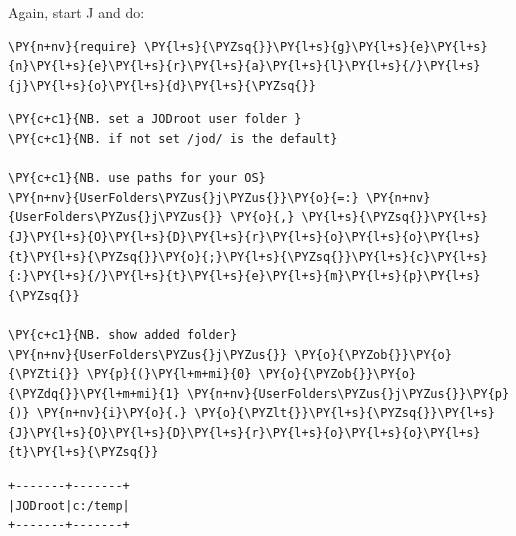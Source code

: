 Again, start J and do:

    \begin{tcolorbox}[breakable, size=fbox, boxrule=1pt, pad at break*=1mm,colback=cellbackground, colframe=cellborder]
\begin{Verbatim}[commandchars=\\\{\}]
\PY{n+nv}{require} \PY{l+s}{\PYZsq{}}\PY{l+s}{g}\PY{l+s}{e}\PY{l+s}{n}\PY{l+s}{e}\PY{l+s}{r}\PY{l+s}{a}\PY{l+s}{l}\PY{l+s}{/}\PY{l+s}{j}\PY{l+s}{o}\PY{l+s}{d}\PY{l+s}{\PYZsq{}}
\end{Verbatim}
\end{tcolorbox}

    \begin{tcolorbox}[breakable, size=fbox, boxrule=1pt, pad at break*=1mm,colback=cellbackground, colframe=cellborder]
\begin{Verbatim}[commandchars=\\\{\}]
\PY{c+c1}{NB. set a JODroot user folder }
\PY{c+c1}{NB. if not set /jod/ is the default}

\PY{c+c1}{NB. use paths for your OS}
\PY{n+nv}{UserFolders\PYZus{}j\PYZus{}}\PY{o}{=:} \PY{n+nv}{UserFolders\PYZus{}j\PYZus{}} \PY{o}{,} \PY{l+s}{\PYZsq{}}\PY{l+s}{J}\PY{l+s}{O}\PY{l+s}{D}\PY{l+s}{r}\PY{l+s}{o}\PY{l+s}{o}\PY{l+s}{t}\PY{l+s}{\PYZsq{}}\PY{o}{;}\PY{l+s}{\PYZsq{}}\PY{l+s}{c}\PY{l+s}{:}\PY{l+s}{/}\PY{l+s}{t}\PY{l+s}{e}\PY{l+s}{m}\PY{l+s}{p}\PY{l+s}{\PYZsq{}}

\PY{c+c1}{NB. show added folder}
\PY{n+nv}{UserFolders\PYZus{}j\PYZus{}} \PY{o}{\PYZob{}}\PY{o}{\PYZti{}} \PY{p}{(}\PY{l+m+mi}{0} \PY{o}{\PYZob{}}\PY{o}{\PYZdq{}}\PY{l+m+mi}{1} \PY{n+nv}{UserFolders\PYZus{}j\PYZus{}}\PY{p}{)} \PY{n+nv}{i}\PY{o}{.} \PY{o}{\PYZlt{}}\PY{l+s}{\PYZsq{}}\PY{l+s}{J}\PY{l+s}{O}\PY{l+s}{D}\PY{l+s}{r}\PY{l+s}{o}\PY{l+s}{o}\PY{l+s}{t}\PY{l+s}{\PYZsq{}}
\end{Verbatim}
\end{tcolorbox}

    \begin{Verbatim}[commandchars=\\\{\}]
+-------+-------+
|JODroot|c:/temp|
+-------+-------+
    \end{Verbatim}


